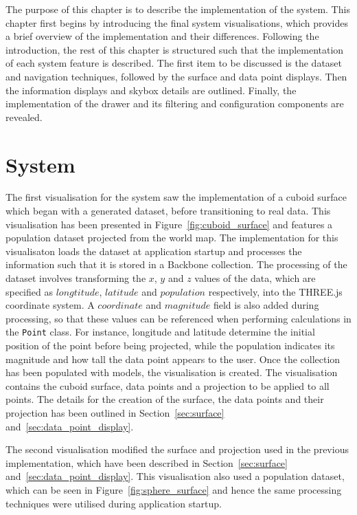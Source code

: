 
The purpose of this chapter is to describe the implementation of the system. This chapter first begins by introducing the final system visualisations, which provides a brief overview of the implementation and their differences. Following the introduction, the rest of this chapter is structured such that the implementation of each system feature is described. The first item to be discussed is the dataset and navigation techniques, followed by the surface and data point displays. Then the information displays and skybox details are outlined. Finally, the implementation of the drawer and its filtering and configuration components are revealed.

\section{System} {
\label{sec:system}

	The first visualisation for the system saw the implementation of a cuboid surface which began with a generated dataset, before transitioning to real data. This visualisation has been presented in Figure~\ref{fig:cuboid_surface} and features a population dataset projected from the world map. The implementation for this visualisaton loads the dataset at application startup and processes the information such that it is stored in a Backbone collection. The processing of the dataset involves transforming the $x$, $y$ and $z$ values of the data, which are specified as $longtitude$, $latitude$ and $population$ respectively, into the THREE.js coordinate system. A $coordinate$ and $magnitude$ field is also added during processing, so that these values can be referenced when performing calculations in the \texttt{Point} class. For instance, longitude and latitude determine the initial position of the point before being projected, while the population indicates its magnitude and how tall the data point appears to the user. Once the collection has been populated with models, the visualisation is created. The visualisation contains the cuboid surface, data points and a projection to be applied to all points. The details for the creation of the surface, the data points and their projection has been outlined in Section~\ref{sec:surface} and~\ref{sec:data_point_display}.

	

	The second visualisation modified the surface and projection used in the previous implementation, which have been described in Section~\ref{sec:surface} and~\ref{sec:data_point_display}. This visualisation also used a population dataset, which can be seen in Figure~\ref{fig:sphere_surface} and hence the same processing techniques were utilised during application startup.

}
